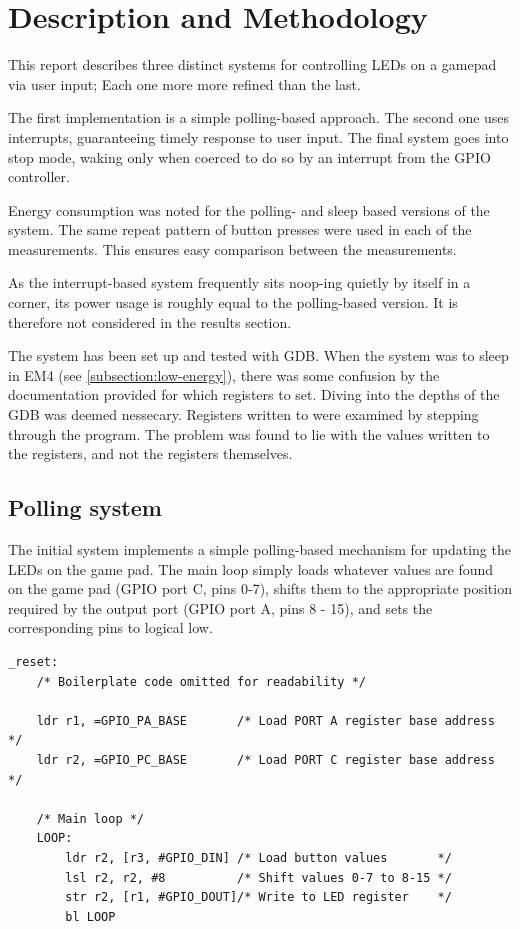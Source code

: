 \section{Description and Methodology}

This report describes three distinct systems for controlling LEDs on a gamepad via user input; Each one more more refined than the last.

The first implementation is a simple polling-based approach. The second one uses interrupts, guaranteeing timely response to user input. The final system goes into stop mode, waking only when coerced to do so by an interrupt from the GPIO controller.

Energy consumption was noted for the polling- and sleep based versions of the system. The same repeat pattern of button presses were used in each of the measurements. This ensures easy comparison between the measurements.

As the interrupt-based system frequently sits noop-ing quietly by itself in a corner, its power usage is roughly equal to the polling-based version. It is therefore not considered in the results section. 

The system has been set up and tested with GDB.
When the system was to sleep in EM4 (see \ref{subsection:low-energy}), there was some confusion by the documentation provided for which registers to set. Diving into the depths of the GDB was deemed nessecary.
Registers written to were examined by stepping through the program. The problem was found to lie with the values written to the registers, and not the registers themselves.

\subsection{Polling system}
\label{subsection:polling}

The initial system implements a simple polling-based mechanism for updating the LEDs on the game pad. The main loop simply loads whatever values are found on the game pad (GPIO port C, pins 0-7), shifts them to the appropriate position required by the output port (GPIO port A, pins 8 - 15), and sets the corresponding pins to logical low.

\begin{lstlisting}[caption={Polling loop}, label={lst:polling-loop}]
_reset:
    /* Boilerplate code omitted for readability */

    ldr r1, =GPIO_PA_BASE       /* Load PORT A register base address    */
    ldr r2, =GPIO_PC_BASE       /* Load PORT C register base address    */

    /* Main loop */
    LOOP:
        ldr r2, [r3, #GPIO_DIN] /* Load button values       */
        lsl r2, r2, #8          /* Shift values 0-7 to 8-15 */
        str r2, [r1, #GPIO_DOUT]/* Write to LED register    */
        bl LOOP

\end{lstlisting}

